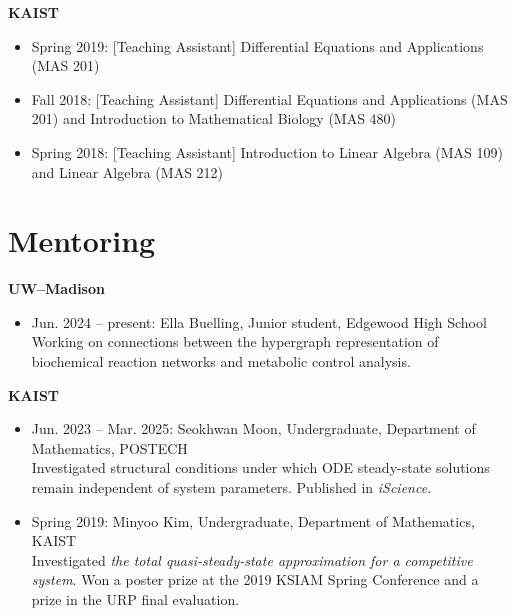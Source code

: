 \documentclass[margin,line]{res}
\newcommand{\vspacesection}{\vspace*{-1.5mm}}
\begin{document}
\begin{resume}
\textbf{KAIST}
\begin{itemize}
    \item Spring 2019: [Teaching Assistant] Differential Equations and Applications (MAS 201)
    \item Fall 2018: [Teaching Assistant] Differential Equations and Applications (MAS 201) and Introduction to Mathematical Biology (MAS 480)
    \item Spring 2018: [Teaching Assistant] Introduction to Linear Algebra (MAS 109) and Linear Algebra (MAS 212)
\end{itemize}

\section{\sc Mentoring}
\textbf{UW--Madison}
\begin{itemize}
    \item Jun. 2024 – present: Ella Buelling, Junior student, Edgewood High School\\
    Working on connections between the hypergraph representation of biochemical reaction networks and metabolic control analysis.
\end{itemize}
\vspacesection
\textbf{KAIST}
\begin{itemize}
    \item Jun. 2023 – Mar. 2025: Seokhwan Moon, Undergraduate, Department of Mathematics, POSTECH\\
    Investigated structural conditions under which ODE steady-state solutions remain independent of system parameters. Published in \textit{iScience}.
    \item Spring 2019: Minyoo Kim, Undergraduate, Department of Mathematics, KAIST\\
    Investigated \textit{the total quasi-steady-state approximation for a competitive system}. Won a poster prize at the 2019 KSIAM Spring Conference and a prize in the URP final evaluation.
\end{itemize}
\vspacesection

\end{resume}
\end{document}
